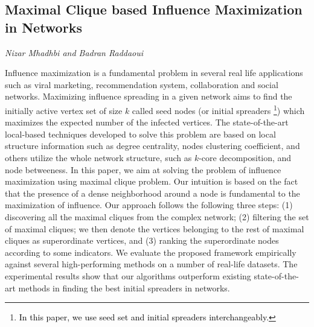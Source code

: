\documentclass[../booklet.tex]{subfiles}
\begin{document}
\subsection[Maximal Clique based Influence Maximization in Networks. {\it Nizar Mhadhbi and Badran Raddaoui}]{Maximal Clique based Influence Maximization in Networks}
 

\begin{center}
  {\it Nizar Mhadhbi and Badran Raddaoui}
\end{center}



Influence maximization is a fundamental problem in several real life applications such as viral marketing, recommendation system, collaboration and social networks.
Maximizing influence spreading in a given network  aims to find  the initially active vertex set of size $k$ called seed nodes (or initial spreaders \footnote{\textcolor{black}{In this paper, we use seed set and initial spreaders interchangeably.}})
which maximizes the expected number of the infected vertices.
The state-of-the-art local-based techniques developed to solve this problem are based  on  local  structure  information  such  as  degree  centrality, nodes clustering  coefficient, and  others  utilize the whole  network  structure, such  as $k$-core decomposition, and node betweeness.
In this paper, we aim at solving the problem of influence maximization using maximal clique problem.
Our intuition is based on the fact that the presence
of  a  dense  neighborhood  around  a  node  is  fundamental  to  the  maximization
of influence.
Our approach follows the following three steps: (1) discovering all the maximal cliques from the complex network; (2) filtering the set of maximal cliques; we then denote the vertices belonging to the rest of maximal cliques as superordinate vertices, and (3) ranking the superordinate nodes according to some indicators.
We evaluate the proposed framework empirically against several high-performing methods on a number of real-life datasets. The experimental results show that our algorithms outperform existing state-of-the-art
methods in finding the best initial spreaders  in networks.

\end{document}
